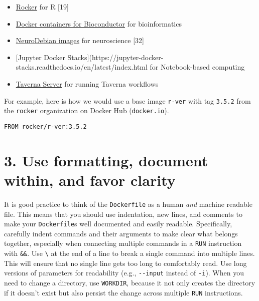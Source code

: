 \documentclass[10pt,letterpaper]{article}
\providecommand{\tightlist}{%
  \setlength{\itemsep}{0pt}\setlength{\parskip}{0pt}}
\begin{document}
\begin{itemize}
\tightlist
\item
  \href{https://www.rocker-project.org/}{Rocker} for R {[}19{]}
\item
  \href{https://bioconductor.org/help/docker/}{Docker containers for
  Bioconductor} for bioinformatics
\item
  \href{https://hub.docker.com/_/neurodebian}{NeuroDebian images} for
  neuroscience {[}32{]}
\item
  {[}Jupyter Docker
  Stacks{]}(https://jupyter-docker-stacks.readthedocs.io/en/latest/index.html
  for Notebook-based computing
\item
  \href{https://hub.docker.com/r/taverna/taverna-server}{Taverna Server}
  for running Taverna workflows
\end{itemize}

For example, here is how we would use a base image \texttt{r-ver} with
tag \texttt{3.5.2} from the \texttt{rocker} organization on Docker Hub
(\texttt{docker.io}).

\begin{verbatim}
FROM rocker/r-ver:3.5.2
\end{verbatim}

\hypertarget{use-formatting-document-within-and-favor-clarity}{%
\section{3. Use formatting, document within, and favor
clarity}\label{use-formatting-document-within-and-favor-clarity}}

  \label{rule:formatting} 

It is good practice to think of the \texttt{Dockerfile} as a human
\emph{and} machine readable file. This means that you should use
indentation, new lines, and comments to make your \texttt{Dockerfile}s
well documented and easily readable. Specifically, carefully indent
commands and their arguments to make clear what belongs together,
especially when connecting multiple commands in a \texttt{RUN}
instruction with \texttt{\&\&}. Use \texttt{\textbackslash{}} at the end
of a line to break a single command into multiple lines. This will
ensure that no single line gets too long to comfortably read. Use long
versions of parameters for readability (e.g., \texttt{-\/-input} instead
of \texttt{-i}). When you need to change a directory, use
\texttt{WORKDIR}, because it not only creates the directory if it
doesn't exist but also persist the change across multiple \texttt{RUN}
instructions.
\end{document}
